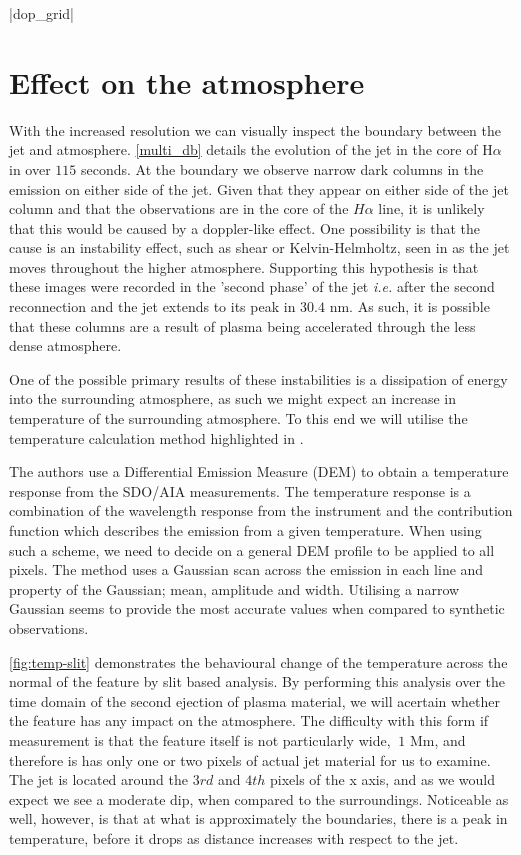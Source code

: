 \py[chapter5]|dop_grid|





\section{Effect on the atmosphere}
\label{temp_map_sect}

With the increased resolution we can visually inspect the boundary between the jet and atmosphere.
\cref{multi_db} details the evolution of the jet in the core of H$\alpha$ in over $115$ seconds.
At the boundary we observe narrow dark columns in the emission on either side of the jet.
Given that they appear on either side of the jet column and that the observations are in the core of the $H\alpha$ line, it is unlikely that this would be caused by a doppler-like effect.
One possibility is that the cause is an instability effect, such as shear or Kelvin-Helmholtz, seen in \cite{Zaqarashvili2014} as the jet moves throughout the higher atmosphere.
Supporting this hypothesis is that these images were recorded in the 'second phase' of the jet \emph{i.e.} after the second reconnection and the jet extends to its peak in $30.4$ nm. 
As such, it is possible that these columns are a result of plasma being accelerated through the less dense atmosphere.

One of the possible primary results of these instabilities is a dissipation of energy into the surrounding atmosphere, as such we might expect an increase in temperature of the surrounding atmosphere.
To this end we will utilise the temperature calculation method highlighted in \cite{Leonard2014}.

The authors use a Differential Emission Measure (DEM) to obtain a temperature response from the SDO/AIA measurements.
The temperature response is a combination of the wavelength response from the instrument and the contribution function which describes the emission from a given temperature.
When using such a scheme, we need to decide on a general DEM profile to be applied to all pixels.
The method uses a Gaussian scan across the emission in each line and property of the Gaussian; mean, amplitude and width. 
Utilising a narrow Gaussian seems to provide the most accurate values when compared to synthetic observations.

\cref{fig:temp-slit} demonstrates the behavioural change of the temperature across the normal of the feature by slit based analysis.
By performing this analysis over the time domain of the second ejection of plasma material, we will acertain whether the feature has any impact on the atmosphere.
The difficulty with this form if measurement is that the feature itself is not particularly wide, $~1$ Mm, and therefore is has only one or two pixels of actual jet material for us to examine.
The jet is located around the $3rd$ and $4th$ pixels of the x axis, and as we would expect we see a moderate dip, when compared to the surroundings. 
Noticeable as well, however, is that at what is approximately the boundaries, there is a peak in temperature, before it drops as distance increases with respect to the jet.

